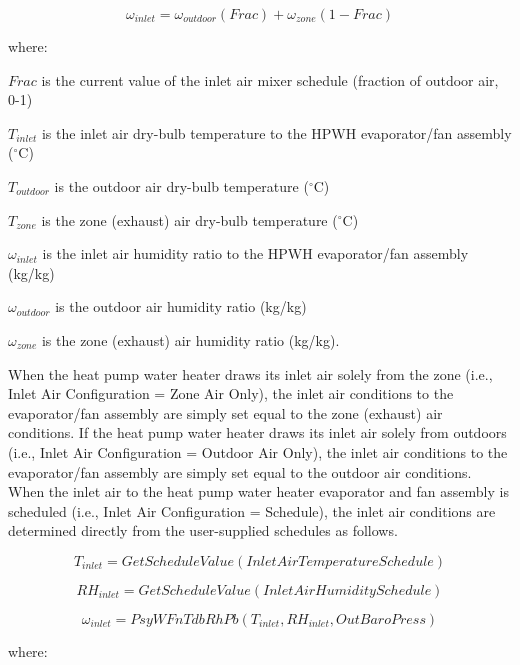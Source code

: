 \begin{equation}
{\omega_{inlet}} = {\omega_{outdoor}}\left( {Frac} \right) + {\omega_{zone}}\left( {1 - Frac} \right)
\end{equation}

where:

\(Frac\) is the current value of the inlet air mixer schedule (fraction of outdoor air, 0-1)

\({T_{inlet}}\) is the inlet air dry-bulb temperature to the HPWH evaporator/fan assembly (\(^{\circ}\)C)

\({T_{outdoor}}\) is the outdoor air dry-bulb temperature (\(^{\circ}\)C)

\({T_{zone}}\) is the zone (exhaust) air dry-bulb temperature (\(^{\circ}\)C)

\({\omega_{inlet}}\) is the inlet air humidity ratio to the HPWH evaporator/fan assembly (kg/kg)

\({\omega_{outdoor}}\) is the outdoor air humidity ratio (kg/kg)

\({\omega_{zone}}\) is the zone (exhaust) air humidity ratio (kg/kg).

When the heat pump water heater draws its inlet air solely from the zone (i.e., Inlet Air Configuration = Zone Air Only), the inlet air conditions to the evaporator/fan assembly are simply set equal to the zone (exhaust) air conditions. If the heat pump water heater draws its inlet air solely from outdoors (i.e., Inlet Air Configuration = Outdoor Air Only), the inlet air conditions to the evaporator/fan assembly are simply set equal to the outdoor air conditions. When the inlet air to the heat pump water heater evaporator and fan assembly is scheduled (i.e., Inlet Air Configuration = Schedule), the inlet air conditions are determined directly from the user-supplied schedules as follows.

\begin{equation}
{T_{inlet}} = GetScheduleValue(InletAirTemperatureSchedule)
\end{equation}

\begin{equation}
{RH_{inlet}} = GetScheduleValue(InletAirHumiditySchedule)
\end{equation}

\begin{equation}
{\omega_{inlet}} = PsyWFnTdbRhPb({T_{inlet}},R{H_{inlet}},OutBaroPress)
\end{equation}

where:

